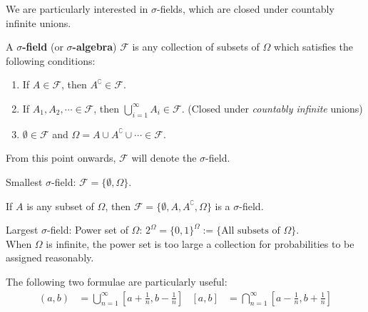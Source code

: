 \documentclass{huhtakm-template-book}
\begin{document}
    \newpage
    We are particularly interested in $\sigma$-fields, which are closed under countably infinite unions.
    \begin{defn} %
        A \textbf{$\sigma$-field} (or \textbf{$\sigma$-algebra}) $\mathcal{F}$ is any collection of subsets of $\Omega$ which satisfies the following conditions:
        \begin{enumerate}
            \item If $A\in\mathcal{F}$, then $A^{\complement}\in\mathcal{F}$.
            \item If $A_{1},A_{2},\cdots\in\mathcal{F}$, then $\bigcup_{i=1}^{\infty}A_{i}\in\mathcal{F}$. (Closed under \textit{countably infinite} unions)
            \item $\emptyset\in\mathcal{F}$ and $\Omega=A\cup A^{\complement}\cup\cdots\in\mathcal{F}$.
        \end{enumerate}
    \end{defn}
    \begin{rem}
        From this point onwards, $\mathcal{F}$ will denote the $\sigma$-field.
    \end{rem}
    \begin{eg}
        Smallest $\sigma$-field: $\mathcal{F}=\{\emptyset,\Omega\}$.
    \end{eg}
    \begin{eg}
        If $A$ is any subset of $\Omega$, then $\mathcal{F}=\{\emptyset,A,A^{\complement},\Omega\}$ is a $\sigma$-field.
    \end{eg}
    \begin{eg}
        Largest $\sigma$-field: Power set of $\Omega$: $2^{\Omega}=\{0,1\}^{\Omega}:=\{\text{All subsets of }\Omega\}$.\\
        When $\Omega$ is infinite, the power set is too large a collection for probabilities to be assigned reasonably.
    \end{eg}
    \begin{rem}
        The following two formulae are particularly useful:
        \begin{align*}
            (a,b)&=\bigcup_{n=1}^{\infty}\left[a+\frac{1}{n},b-\frac{1}{n}\right] &            [a,b]&=\bigcap_{n=1}^{\infty}\left[a-\frac{1}{n},b+\frac{1}{n}\right]
        \end{align*}
    \end{rem}
    
\end{document}
